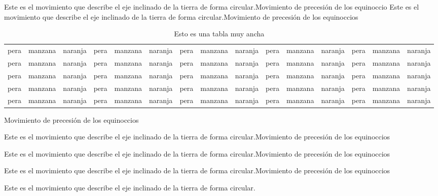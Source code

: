 \documentclass{report}
\begin{document}
	
Este es el movimiento que describe el eje inclinado de la tierra de forma circular.Movimiento de precesión de los equinoccio
Este es el movimiento que describe el eje inclinado de la tierra de forma circular.Movimiento de precesión de los equinoccios

\begin{table}
\centering
\begin{tabular}{*{15}{|c}|}
	\hline
	pera & manzana & naranja &	pera & manzana & naranja & pera & manzana & naranja & pera & manzana & naranja & pera & manzana & naranja \\
	pera & manzana & naranja &	pera & manzana & naranja & pera & manzana & naranja & pera & manzana & naranja & pera & manzana & naranja \\pera & manzana & naranja &	pera & manzana & naranja & pera & manzana & naranja & pera & manzana & naranja & pera & manzana & naranja \\pera & manzana & naranja &	pera & manzana & naranja & pera & manzana & naranja & pera & manzana & naranja & pera & manzana & naranja \\pera & manzana & naranja &	pera & manzana & naranja & pera & manzana & naranja & pera & manzana & naranja & pera & manzana & naranja \\
	\hline	
\end{tabular}	
\caption{Esto es una tabla muy ancha}	
\end{table}
	

\begin{multicols}{3}
Movimiento de precesión de los equinoccios

\columnbreak
Este es el movimiento que describe el eje inclinado de la tierra de forma circular.Movimiento de precesión de los equinoccios

Este es el movimiento que describe el eje inclinado de la tierra de forma circular.Movimiento de precesión de los equinoccios

Este es el movimiento que describe el eje inclinado de la tierra de forma circular.Movimiento de precesión de los equinoccios

Este es el movimiento que describe el eje inclinado de la tierra de forma circular.
\end{multicols}
\end{document}
